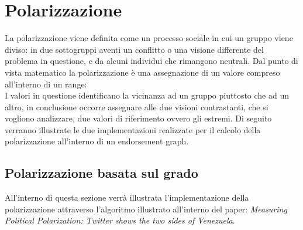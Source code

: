 \section{Polarizzazione}
\label{Polarizzazione}
La polarizzazione viene definita come un processo sociale in cui un gruppo viene diviso: 
in due sottogruppi aventi un conflitto o una visione differente del problema in questione, e da alcuni individui che rimangono neutrali.
Dal punto di vista matematico la polarizzazione è una assegnazione di un valore compreso all'interno di un range:
\begin{equation}
[-1,1]
\end{equation}
I valori in questione identificano la vicinanza ad un gruppo piuttosto che ad un altro, in conclusione occorre assegnare alle due visioni contrastanti, che si vogliono analizzare, due valori di riferimento ovvero gli estremi.
Di seguito verranno illustrate le due implementazioni realizzate per il calcolo della polarizzazione all'interno di un endorsement graph.

\subsection{Polarizzazione basata sul grado}
All'interno di questa sezione verrà illustrata l'implementazione della polarizzazione attraverso l'algoritmo illustrato all'interno del paper: \textit{Measuring Political Polarization: Twitter shows the two sides of Venezuela}.

